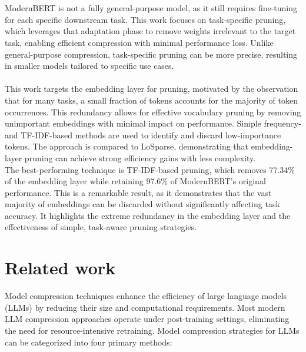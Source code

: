\documentclass[twocolumn]{article}
\begin{document}
\\ \\
ModernBERT is not a fully general-purpose model, as it still requires fine-tuning for each specific downstream task. This work focuses on task-specific pruning, which leverages that adaptation phase to remove weights irrelevant to the target task, enabling efficient compression with minimal performance loss. Unlike general-purpose compression, task-specific pruning can be more precise, resulting in smaller models tailored to specific use cases.
\\ \\
This work targets the embedding layer for pruning, motivated by the observation that for many tasks, a small fraction of tokens accounts for the majority of token occurrences. 
This redundancy allows for effective vocabulary pruning by removing unimportant embeddings with minimal impact on performance. 
Simple frequency- and TF-IDF-based methods are used to identify and discard low-importance tokens. 
The approach is compared to LoSparse, demonstrating that embedding-layer pruning can achieve strong efficiency gains with less complexity.
\\
The best-performing technique is TF-IDF-based pruning, which removes 77.34\% of the embedding layer while retaining 97.6\% of ModernBERT's original performance. This is a remarkable result, as it demonstrates that the vast majority of embeddings can be discarded without significantly affecting task accuracy. It highlights the extreme redundancy in the embedding layer and the effectiveness of simple, task-aware pruning strategies.

\section{Related work}
Model compression techniques enhance the efficiency of large language models (LLMs) by reducing their size and computational requirements. Most modern LLM compression approaches operate under post-training settings, eliminating the need for resource-intensive retraining. Model compression strategies for LLMs can be categorized into four primary methods:
\end{document}
